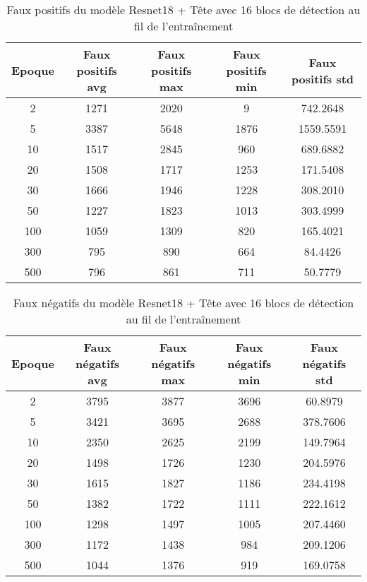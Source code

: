 \begin{table}[!ht]
    \caption{Faux positifs du modèle Resnet18 + Tête avec 16 blocs de détection au fil de l'entraînement}
    \label{tab:resnet18+head_16n_false_positive}
    \centering
    \begin{tabular}{ |c||c|c|c|c|  }
        \hline
        \rowcolor{gray!50}
        Epoque & Faux positifs avg & Faux positifs max & Faux positifs min & Faux positifs std\\
        \hline
        2 & 1271 & 2020 & 9 & 742.2648\\
        5 & 3387 & 5648 & 1876 & 1559.5591\\
        10 & 1517 & 2845 & 960 & 689.6882\\
        20 & 1508 & 1717 & 1253 & 171.5408\\
        30 & 1666 & 1946 & 1228 & 308.2010\\
        50 & 1227 & 1823 & 1013 & 303.4999\\
        100 & 1059 & 1309 & 820 & 165.4021\\
        300 & 795 & 890 & 664 & 84.4426\\
        500 & 796 & 861 & 711 & 50.7779\\
        \hline
    \end{tabular}
\end{table}

\begin{table}[!ht]
    \caption{Faux négatifs du modèle Resnet18 + Tête avec 16 blocs de détection au fil de l'entraînement}
    \label{tab:resnet18+head_16n_false_negative}
    \centering
    \begin{tabular}{ |c||c|c|c|c|  }
        \hline
        \rowcolor{gray!50}
        Epoque & Faux négatifs avg & Faux négatifs max & Faux négatifs min & Faux négatifs std\\
        \hline
        2 & 3795 & 3877 & 3696 & 60.8979\\
        5 & 3421 & 3695 & 2688 & 378.7606\\
        10 & 2350 & 2625 & 2199 & 149.7964\\
        20 & 1498 & 1726 & 1230 & 204.5976\\
        30 & 1615 & 1827 & 1186 & 234.4198\\
        50 & 1382 & 1722 & 1111 & 222.1612\\
        100 & 1298 & 1497 & 1005 & 207.4460\\
        300 & 1172 & 1438 & 984 & 209.1206\\
        500 & 1044 & 1376 & 919 & 169.0758\\
        \hline
    \end{tabular}
\end{table}

